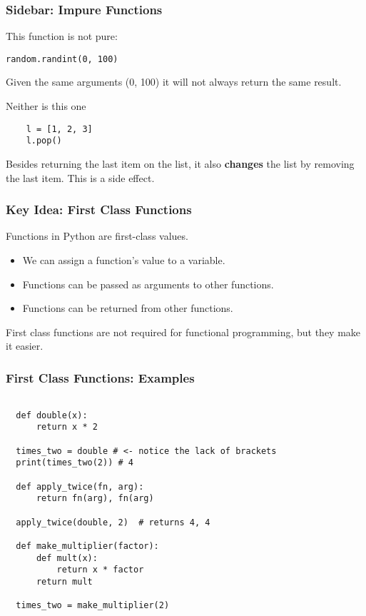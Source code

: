 \documentclass[10pt]{beamer}
\begin{document}
\begin{frame}[fragile]
  \frametitle{Sidebar: Impure Functions}
  
  This function is not pure:
  
  \vspace{5mm}
  \texttt{random.randint(0, 100)}
  
  \vspace{5mm}
  Given the same arguments (0, 100) it will not always return the same 
  result.
  
  \vspace{10mm}
  Neither is this one
  \begin{verbatim}
    l = [1, 2, 3]
    l.pop()
  \end{verbatim}
  \vspace{5mm}
  Besides returning the last item on the list, it also \textbf{changes} the list by removing 
  the last item. This is a side effect.  
\end{frame}

\begin{frame}
  \frametitle{Key Idea: First Class Functions}
  
  Functions in Python are first-class values.
  \begin{itemize}
    \item We can assign a function's value to a variable.
    \item Functions can be passed as arguments to other functions.
    \item Functions can be returned from other functions.
  \end{itemize}  
  
  \vspace{5mm}
  First class functions are not required for functional programming, but
  they make it easier.
  
  \end{frame}

\begin{frame}[fragile]
  \frametitle{First Class Functions: Examples}
  
  \begin{verbatim}

  def double(x):
      return x * 2
      
  times_two = double # <- notice the lack of brackets
  print(times_two(2)) # 4    
  
  def apply_twice(fn, arg):
      return fn(arg), fn(arg)
  
  apply_twice(double, 2)  # returns 4, 4
  
  def make_multiplier(factor):
      def mult(x):
          return x * factor
      return mult
      
  times_two = make_multiplier(2)         
    
  \end{verbatim}
\end{frame}
\end{document}
